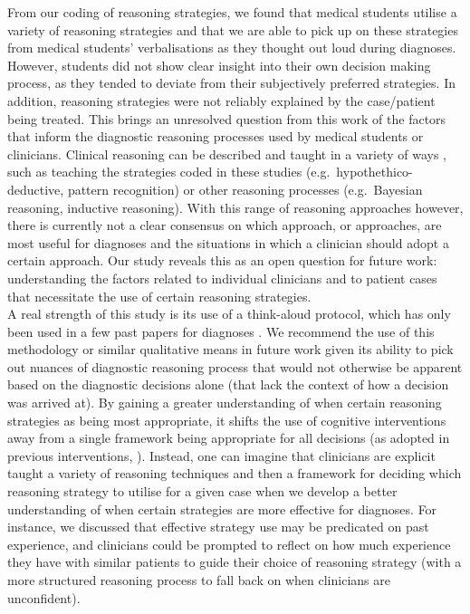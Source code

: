 \documentclass[a4paper, nobind]{templates/ociamthesis}
\begin{document}
From our coding of reasoning strategies, we found that medical students utilise a variety of reasoning strategies and that we are able to pick up on these strategies from medical students' verbalisations as they thought out loud during diagnoses. However, students did not show clear insight into their own decision making process, as they tended to deviate from their subjectively preferred strategies. In addition, reasoning strategies were not reliably explained by the case/patient being treated. This brings an unresolved question from this work of the factors that inform the diagnostic reasoning processes used by medical students or clinicians. Clinical reasoning can be described and taught in a variety of ways \autocite{royce_teaching_2019}, such as teaching the strategies coded in these studies (e.g.~hypothethico-deductive, pattern recognition) or other reasoning processes (e.g.~Bayesian reasoning, inductive reasoning). With this range of reasoning approaches however, there is currently not a clear consensus on which approach, or approaches, are most useful for diagnoses and the situations in which a clinician should adopt a certain approach. Our study reveals this as an open question for future work: understanding the factors related to individual clinicians and to patient cases that necessitate the use of certain reasoning strategies.\\

A real strength of this study is its use of a think-aloud protocol, which has only been used in a few past papers for diagnoses \autocite{arocha_novice_1995,coderre_diagnostic_2003}. We recommend the use of this methodology or similar qualitative means in future work given its ability to pick out nuances of diagnostic reasoning process that would not otherwise be apparent based on the diagnostic decisions alone (that lack the context of how a decision was arrived at). By gaining a greater understanding of when certain reasoning strategies as being most appropriate, it shifts the use of cognitive interventions away from a single framework being appropriate for all decisions (as adopted in previous interventions, \autocite{graber_cognitive_2012,lambe_dual-process_2016}). Instead, one can imagine that clinicians are explicit taught a variety of reasoning techniques and then a framework for deciding which reasoning strategy to utilise for a given case when we develop a better understanding of when certain strategies are more effective for diagnoses. For instance, we discussed that effective strategy use may be predicated on past experience, and clinicians could be prompted to reflect on how much experience they have with similar patients to guide their choice of reasoning strategy (with a more structured reasoning process to fall back on when clinicians are unconfident).\\
\end{document}
